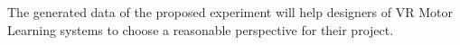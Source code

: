 The generated data of the proposed experiment will help designers of VR Motor Learning systems to choose a reasonable perspective for their project.




